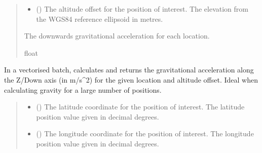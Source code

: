 \documentclass[letterpaper,10pt,english]{sphinxmanual}
\begin{document}
\begin{fulllineitems}
\begin{fulllineitems}
\begin{quote}
\begin{description}
\begin{itemize}
\item {} 
\sphinxAtStartPar
{} () \textendash{} The altitude offset for the position of interest.
The elevation from the WGS\sphinxhyphen{}84 reference ellipsoid in metres.

\end{itemize}

\sphinxAtStartPar
The downwards gravitational acceleration for each location.

\sphinxAtStartPar
float

\end{description}\end{quote}

\end{fulllineitems}


\begin{fulllineitems}
\label{\detokenize{modules/gravity/egm:qnav.gravity.egm.GeoidCorrection.calc_gravity_z_vec}}
\pysigstartsignatures
{}
\pysigstopsignatures
\sphinxAtStartPar
In a vectorised batch, calculates and returns the gravitational
acceleration along the Z/Down axis (in m/s\textasciicircum{}2) for the given location
and altitude offset. Ideal when calculating gravity for a large
number of positions.
\begin{quote}\begin{description}
\begin{itemize}
\item {} 
\sphinxAtStartPar
{} () \textendash{} The latitude coordinate for the position of interest.
The latitude position value given in decimal degrees.

\item {} 
\sphinxAtStartPar
{} () \textendash{} The longitude coordinate for the position of interest.
The longitude position value given in decimal degrees.


\end{itemize}
\end{description}
\end{quote}
\end{fulllineitems}
\end{fulllineitems}
\end{document}
